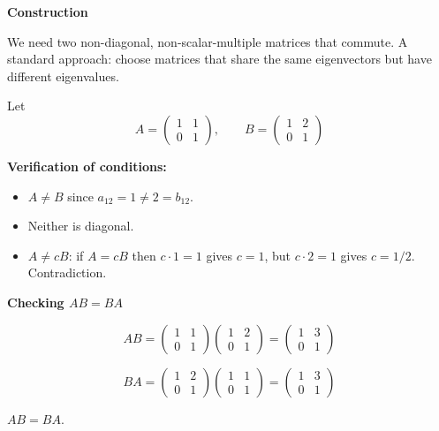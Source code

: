 \documentclass[12pt]{article}
\begin{document}
\begin{stepbox}
\textbf{Construction}

We need two non-diagonal, non-scalar-multiple matrices that commute. A standard approach: choose matrices that share the same eigenvectors but have different eigenvalues.

Let
\[
A = \begin{pmatrix} 1 & 1 \\ 0 & 1 \end{pmatrix}, \qquad
B = \begin{pmatrix} 1 & 2 \\ 0 & 1 \end{pmatrix}
\]

\textbf{Verification of conditions:}
\begin{itemize}
    \item $A \neq B$ since $a_{12} = 1 \neq 2 = b_{12}$. \checkmark
    \item Neither is diagonal. \checkmark
    \item $A \neq cB$: if $A = cB$ then $c \cdot 1 = 1$ gives $c=1$, but $c \cdot 2 = 1$ gives $c = 1/2$. Contradiction. \checkmark
\end{itemize}
\end{stepbox}

\begin{stepbox}
\textbf{Checking $AB = BA$}

\[
AB = \begin{pmatrix} 1 & 1 \\ 0 & 1 \end{pmatrix}\begin{pmatrix} 1 & 2 \\ 0 & 1 \end{pmatrix} = \begin{pmatrix} 1 & 3 \\ 0 & 1 \end{pmatrix}
\]

\[
BA = \begin{pmatrix} 1 & 2 \\ 0 & 1 \end{pmatrix}\begin{pmatrix} 1 & 1 \\ 0 & 1 \end{pmatrix} = \begin{pmatrix} 1 & 3 \\ 0 & 1 \end{pmatrix}
\]

$AB = BA$. \checkmark
\end{stepbox}
\end{document}

